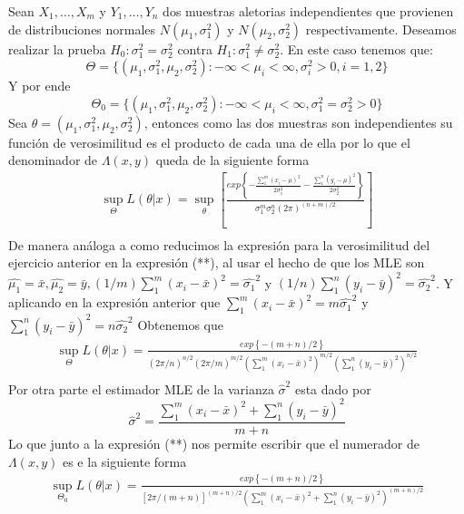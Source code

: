 \documentclass[peerreview]{IEEEtran}
\begin{document}
Sean $X_1,\dots, X_m$ y $Y_1,\dots, Y_n$ dos muestras aletorias independientes que provienen de distribuciones normales $N(\mu_1, \sigma_1^2)$ y $N(\mu_2, \sigma_2^2)$ respectivamente. Deseamos realizar la prueba $H_0:\sigma_1^2 = \sigma_2^2$ contra $H_1: \sigma_1^2 \ne \sigma_2^2$. En este caso tenemos que:
\[
\Theta = \{ (\mu_1, \sigma_1^2, \mu_2, \sigma_2^2 ): -\infty < \mu_i < \infty , \sigma_i^2 >0, i=1,2\}
\]
Y por ende
\[
\Theta_0 = \{ (\mu_1, \sigma_1^2, \mu_2, \sigma_2^2 ): -\infty < \mu_i < \infty , \sigma_1^2=\sigma_2^2  >0\}
\]
Sea $\theta = (\mu_1, \sigma_1^2, \mu_2, \sigma_2^2 )$, entonces como las dos muestras son independientes su función de verosimilitud es el producto de cada una de ella por lo que el denominador de $\Lambda(x,y)$ queda de la siguiente forma  
\begin{equation*}
\begin{split}
\sup_\Theta L(\theta | x) = \sup_{\theta} \left[ \frac{exp\left\{  -\frac{\sum_1^m(x_i-\mu)^2}{2\sigma_1^2} -\frac{\sum_1^n(y_i-\mu)^2}{2\sigma_2^2} \right\}}{ \sigma_1^m\sigma_2^n{(2\pi)}^{(n+m)/2}}   \right] \\
\end{split}
\end{equation*}
De manera análoga a como reducimos la expresión para la verosimilitud del ejercicio anterior en la expresión (**), al usar el hecho de que los MLE son $\hat{\mu_1} = \bar{x}, \hat{\mu_2} = \bar{y},(1/m)\sum_1^m(x_i-\bar{x})^2 = \hat{\sigma_1}^2$ y $(1/n)\sum_1^n(y_i-\bar{y})^2 = \hat{\sigma_2}^2$. Y aplicando en la expresión anterior que $ \sum_1^m(x_i-\bar{x})^2 =m \hat{\sigma_1}^2$ y $\sum_1^n(y_i-\bar{y})^2 = n\hat{\sigma_2}^2$
Obtenemos que 
\begin{equation*}
\begin{split}
\sup_\Theta L(\theta | x) =   \frac{exp \left\{  -(m+n)/2 \right\}}{ (2\pi/n)^{n/2}(2\pi/m)^{m/2} \left( \sum_1^m(x_i -\bar{x})^2\right)^{ m/2} \left( \sum_1^n(y_i -\bar{y})^2\right)^{ n/2} }  \\
\end{split}
\end{equation*}
Por otra parte el estimador MLE de la varianza $
\hat{\sigma}^2$ esta dado por \[\hat{\sigma}^2 = \frac{\sum_1^m(x_i -\bar{x})^2 + \sum_1^n(y_i -\bar{y})^2}{m+n}\]
Lo que junto a la expresión (**) nos permite escribir que el numerador de $\Lambda(x,y)$ es e la siguiente forma 
\begin{equation}\tag{***} 
\begin{split} 
\sup_{\Theta_0} L(\theta | x) =   \frac{exp \left\{  -(m+n)/2 \right\}}{ [2\pi/(m+n)]^{(m+n)/2} \left( \sum_1^m(x_i -\bar{x})^2 + \sum_1^n(y_i -\bar{y})^2\right)^{ (m+n)/2} }  \\
\end{split}
\end{equation}
\end{document}
